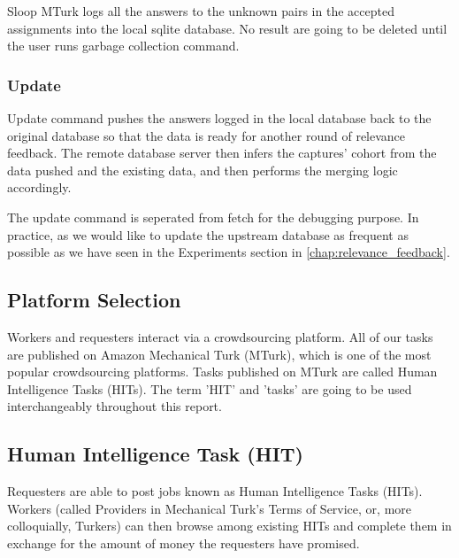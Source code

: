 Sloop MTurk logs all the answers to the unknown pairs in the accepted assignments into the local sqlite database. No result are going to be deleted until the user runs garbage collection command.

\subsubsection{Update}
Update command pushes the answers logged in the local database back to the original database so that the data is ready for another round of relevance feedback. The remote database server then infers the captures' cohort from the data pushed and the existing data, and then performs the merging logic accordingly\cite{sloopdocs}. 

The update command is seperated from fetch for the debugging purpose. In practice, as we would like to update the upstream database as frequent as possible as we have seen in the Experiments section in \ref{chap:relevance_feedback}.

\subsection{Platform Selection}
Workers and requesters interact via a crowdsourcing platform. All of our tasks are published on Amazon Mechanical Turk (MTurk), which is one of the most popular crowdsourcing platforms. Tasks published on MTurk are called Human Intelligence Tasks (HITs). The term 'HIT' and 'tasks' are going to be used interchangeably throughout this report.

\subsection{Human Intelligence Task (HIT)}

Requesters are able to post jobs known as Human Intelligence Tasks (HITs). Workers (called Providers in Mechanical Turk's Terms of Service, or, more colloquially, Turkers) can then browse among existing HITs and complete them in exchange for the amount of money the requesters have promised.

